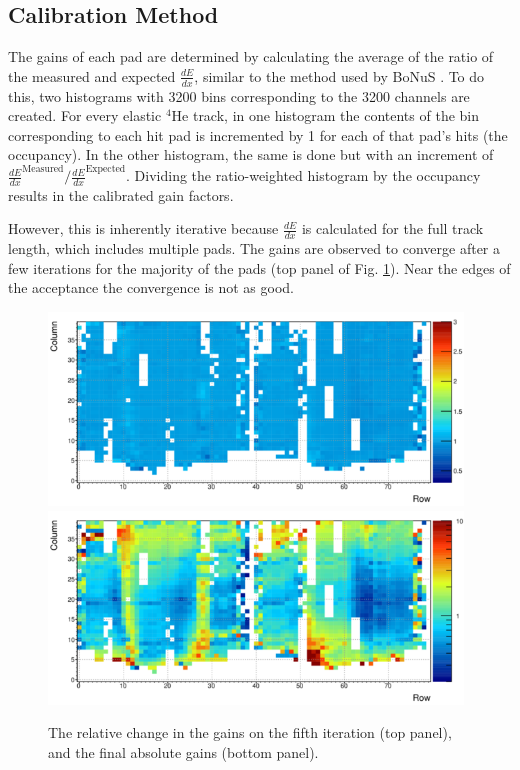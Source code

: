 \documentclass[amsmath,amssymb,notitlepage,12pt]{revtex4-1}
\begin{document}
\subsection{Calibration Method}
The gains of each pad are determined by calculating the average of the ratio of the measured and expected $\frac{dE}{dx}$, similar to the method used by BoNuS \cite{bonusgains}.  To do this, two histograms with 3200 bins corresponding to the 3200 channels are created. For every elastic $^4$He track, in one histogram the contents of the bin corresponding to each hit pad is incremented by 1 for each of that pad's hits (the occupancy).  In the other histogram, the same is done but with an increment of $\frac{dE}{dx}^{\textrm{Measured}}/\frac{dE}{dx}^{\textrm{Expected}}$.
Dividing the ratio-weighted histogram by the occupancy results in the calibrated gain factors.

However, this is inherently iterative because $\frac{dE}{dx}$ is calculated for the full track length, which includes multiple pads.  The gains are observed to converge after a few iterations for the majority of the pads (top panel of Fig. \ref{fig:gains5pass}).  Near the edges of the acceptance the convergence is not as good.
\begin{figure}[htbp]\centering
    \includegraphics[width=11cm]{Gainrel_p56_v11_small.png}
    \includegraphics[width=11cm]{Gainabs_p6_v11_small.png}
    \caption{The relative change in the gains on the fifth iteration (top panel), and the final absolute gains (bottom panel).\label{fig:gains5pass}}
\end{figure}
\end{document}
